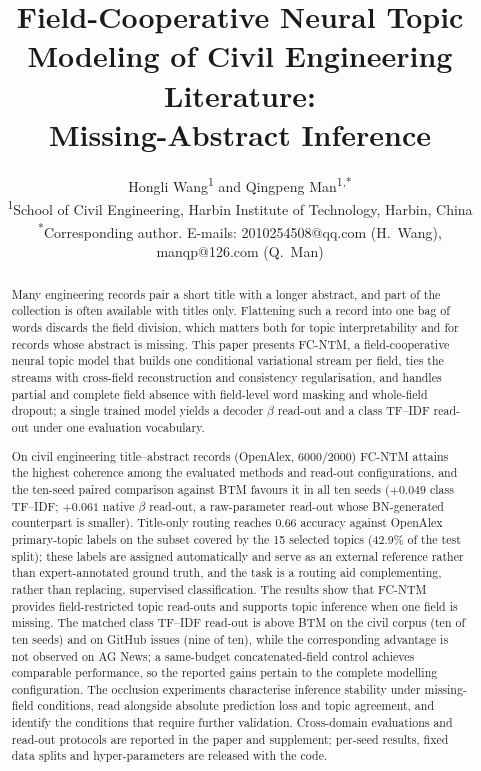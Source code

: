 \documentclass{article}
\title{\bfseries Field-Cooperative Neural Topic Modeling of Civil Engineering Literature:\\
Missing-Abstract Inference}
\author{Hongli Wang\textsuperscript{1} and Qingpeng Man\textsuperscript{1,*}\\[6pt]
\small\textsuperscript{1}School of Civil Engineering, Harbin Institute of Technology, Harbin, China\\
\small\textsuperscript{*}Corresponding author. E-mails: 2010254508@qq.com (H.~Wang), manqp@126.com (Q.~Man)}
\date{}
\begin{document}
\maketitle

\begin{abstract}
Many engineering records pair a short title with a longer abstract, and part of the collection is
often available with titles only. Flattening such a record into one bag of words discards the
field division, which matters both for topic interpretability and for records whose abstract is
missing. This paper presents FC-NTM, a field-cooperative neural topic model that builds one
conditional variational stream per field, ties the streams with cross-field reconstruction and
consistency regularisation, and handles partial and complete field absence with field-level word
masking and whole-field dropout; a single trained model yields a decoder $\beta$ read-out and a
class TF--IDF read-out under one evaluation vocabulary.

On civil engineering title--abstract records (OpenAlex, 6000/2000) FC-NTM attains the highest
coherence among the evaluated methods and read-out configurations, and the ten-seed paired
comparison against BTM favours it in all ten seeds ($+0.049$ class TF--IDF; $+0.061$ native
$\beta$ read-out, a raw-parameter read-out whose BN-generated counterpart is smaller). Title-only routing reaches 0.66 accuracy against OpenAlex primary-topic labels on the subset covered by the 15 selected topics (42.9\% of the test split); these labels are assigned automatically and serve as an external reference rather than expert-annotated ground truth, and the task is a routing aid complementing, rather than replacing, supervised classification. The results show that FC-NTM provides field-restricted topic read-outs and supports topic inference
when one field is missing. The matched class TF--IDF read-out is above BTM on the civil corpus (ten
of ten seeds) and on GitHub issues (nine of ten), while the corresponding advantage is not observed
on AG News; a same-budget concatenated-field control achieves comparable performance, so the reported
gains pertain to the complete modelling configuration. The occlusion experiments characterise
inference stability under missing-field conditions, read alongside absolute prediction loss and topic
agreement, and identify the conditions that require further validation. Cross-domain evaluations
and read-out protocols are reported in the paper and supplement; per-seed results, fixed data
splits and hyper-parameters are released with the code.
\end{abstract}
\end{document}
